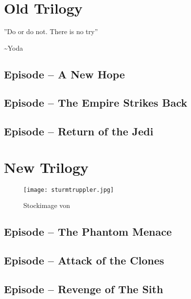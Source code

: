 \section{Old Trilogy}
\epigraph{''Do or do not. There is no try''}{\textasciitilde Yoda}

\subsection{Episode \texorpdfstring{}{4} -- A New Hope}
\lipsum[1-2]
\subsection{Episode \texorpdfstring{}{5} -- The Empire Strikes Back}
\lipsum[2-3]
\subsection{Episode \texorpdfstring{}{6} -- Return of the Jedi}
\lipsum[3-4]

\section{New Trilogy}

\begin{figure}[ht]
\centering
\texttt{[image: sturmtruppler.jpg]}
\caption{Stockimage von \cite{trooper}}
\label{fig:trooper}
\end{figure}

\subsection{Episode \texorpdfstring{}{1} -- The Phantom Menace}
\lipsum[1-2]
\subsection{Episode \texorpdfstring{}{2} -- Attack of the Clones}
\noindent\lipsum[2-2]
\subsection{Episode \texorpdfstring{}{3} -- Revenge of The Sith}
\lipsum[3-4]
